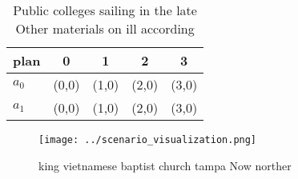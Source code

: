 \documentclass[a4paper]{article}
\begin{document}
\begin{table}
\begin{adjustbox}{width=0.5\columnwidth}
\begin{tabular}{|l|l|l|l|l|}
\hline
\textbf{plan} & \multicolumn{1}{c|}{\textbf{0}} & \multicolumn{1}{c|}{\textbf{1}} & \multicolumn{1}{c|}{\textbf{2}} & \multicolumn{1}{c|}{\textbf{3}} \\ \hline
\textbf{$a_0$}  & (0,0) & (1,0) & (2,0) & (3,0) \\ \hline
\textbf{$a_1$}  & (0,0) & (1,0) & (2,0) & (3,0) \\ \hline
\end{tabular}
\end{adjustbox}
\caption{Public colleges sailing in the late Other materials on ill according 
}
\end{table}

\begin{figure}
\centering
\texttt{[image: ../scenario\_visualization.png]}
\caption{ king vietnamese baptist church tampa Now norther
}
\end{figure}
 
\end{document}
